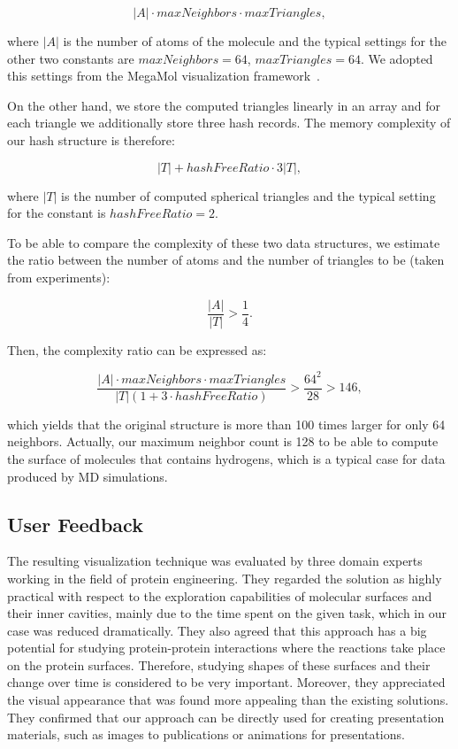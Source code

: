 \begin{equation}
|A| \cdot maxNeighbors \cdot maxTriangles,
\end{equation}

where $|A|$ is the number of atoms of the molecule and the typical settings for the other two constants are $maxNeighbors = 64$, $maxTriangles = 64$.
We adopted this settings from the MegaMol visualization framework~\cite{grottel2015megamol}.

On the other hand, we store the computed triangles linearly in an array and for each triangle we additionally store three hash records. 
The memory complexity of our hash structure is therefore:

\begin{equation}
|T| + hashFreeRatio \cdot 3 |T|,
\end{equation}

where $|T|$ is the number of computed spherical triangles and the typical setting for the constant is $hashFreeRatio = 2$. 

To be able to compare the complexity of these two data structures, we estimate the ratio between the number of atoms and the number of triangles to be (taken from experiments):

\begin{equation}
\frac{|A|}{|T|} > \frac{1}{4}.
\end{equation}

Then, the complexity ratio can be expressed as:

\begin{equation}
\frac{|A| \cdot maxNeighbors \cdot maxTriangles}{|T|(1 + 3 \cdot hashFreeRatio)} > \frac{64^2}{28} > 146,
\end{equation}

which yields that the original structure is more than 100 times larger for only 64 neighbors.
Actually, our maximum neighbor count is 128 to be able to compute the surface of molecules that contains hydrogens, which is a typical case for data produced by MD simulations.


\subsection{User Feedback}
The resulting visualization technique was evaluated by three domain experts working in the field of protein engineering. They regarded the solution as highly practical with respect to the exploration capabilities of molecular surfaces and their inner cavities, mainly due to the time spent on the given task, which in our case was reduced dramatically.
They also agreed that this approach has a big potential for studying protein-protein interactions where the reactions take place on the protein surfaces.
Therefore, studying shapes of these surfaces and their change over time is considered to be very important.
Moreover, they appreciated the visual appearance that was found more appealing than the existing solutions.
They confirmed that our approach can be directly used for creating presentation materials, such as images to publications or animations for presentations.

